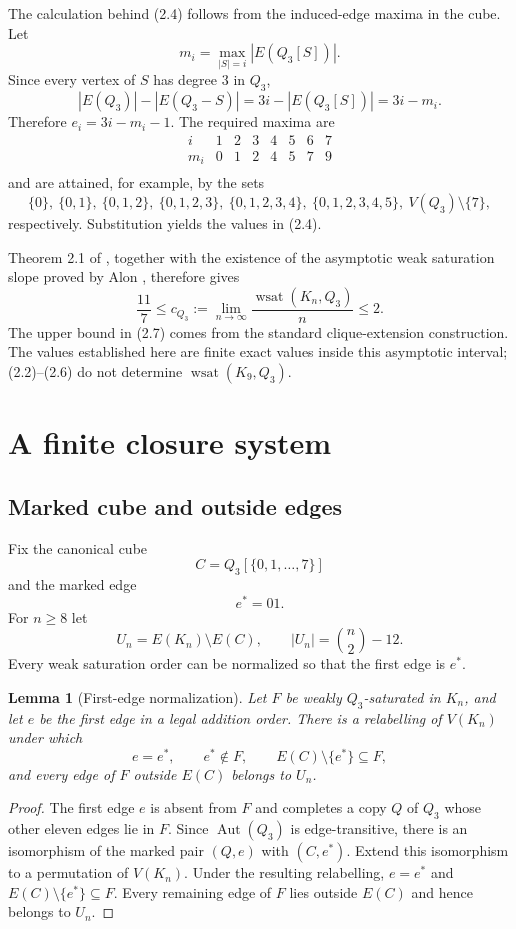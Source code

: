 \documentclass[11pt]{article}
\numberwithin{equation}{section}
\newtheorem{lemma}[theorem]{Lemma}
\newcommand{\wsat}{\operatorname{wsat}}
\newcommand{\Aut}{\operatorname{Aut}}
\begin{document}
The calculation behind (2.4) follows from the induced-edge maxima in the cube. Let
\[
m_i=\max_{|S|=i}|E(Q_3[S])|.
\]
Since every vertex of $S$ has degree $3$ in $Q_3$,
\[
|E(Q_3)|-|E(Q_3-S)|=3i-|E(Q_3[S])|=3i-m_i.
\]
Therefore $e_i=3i-m_i-1$. The required maxima are
\[
\begin{array}{c|ccccccc}
i&1&2&3&4&5&6&7\\ \hline
m_i&0&1&2&4&5&7&9\\
\end{array}
\]
and are attained, for example, by the sets
\[
\{0\},\ \{0,1\},\ \{0,1,2\},\ \{0,1,2,3\},\ \{0,1,2,3,4\},\ \{0,1,2,3,4,5\},\ V(Q_3)\setminus\{7\},
\]
respectively. Substitution yields the values in (2.4).

Theorem 2.1 of \cite{TZ2025}, together with the existence of the asymptotic weak saturation slope proved by Alon \cite{Alon1985}, therefore gives
\[
\frac{11}{7}\le c_{Q_3}:=\lim_{n\to\infty}\frac{\wsat(K_n,Q_3)}{n}\le 2.
\tag{2.7}
\]
The upper bound in (2.7) comes from the standard clique-extension construction. The values established here are finite exact values inside this asymptotic interval; (2.2)--(2.6) do not determine $\wsat(K_9,Q_3)$.

\section{A finite closure system}\label{sec:closure}

\subsection{Marked cube and outside edges}
Fix the canonical cube
\[
C=Q_3[\{0,1,\ldots,7\}]
\]
and the marked edge
\[
e^*=01.
\]
For $n\ge8$ let
\[
U_n=E(K_n)\setminus E(C),
\qquad |U_n|=\binom n2-12.
\tag{3.1}
\]
Every weak saturation order can be normalized so that the first edge is $e^*$.

\begin{lemma}[First-edge normalization]\label{lem:first}
Let $F$ be weakly $Q_3$-saturated in $K_n$, and let $e$ be the first edge in a
legal addition order. There is a relabelling of $V(K_n)$ under which
\[
e=e^*,\qquad e^*\notin F,\qquad E(C)\setminus\{e^*\}\subseteq F,
\]
and every edge of $F$ outside $E(C)$ belongs to $U_n$.
\end{lemma}

\begin{proof}
The first edge $e$ is absent from $F$ and completes a copy $Q$ of $Q_3$ whose
other eleven edges lie in $F$. Since $\Aut(Q_3)$ is edge-transitive, there is
an isomorphism of the marked pair $(Q,e)$ with $(C,e^*)$. Extend this
isomorphism to a permutation of $V(K_n)$. Under the resulting relabelling,
$e=e^*$ and $E(C)\setminus\{e^*\}\subseteq F$. Every remaining edge of $F$
lies outside $E(C)$ and hence belongs to $U_n$.
\end{proof}
\end{document}
